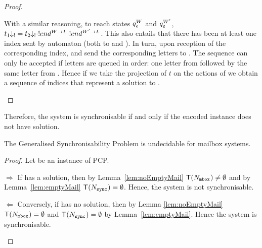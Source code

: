 \begin{proof}
\begin{compactdesc}
 With a similar reasoning, to reach states ${q}_{e}^{W}$ and ${q}_{e}^{W'}$,  $t_1{\downarrow_{!}} = t_2{\downarrow_{!}}  \cdot !end^{W \rightarrow L} \cdot !end^{W' \rightarrow L}$.
 This also entails that there has been at least one index sent by automaton  (both to  and ).
 In turn, upon reception of the corresponding index,   and  send the corresponding letters to . 
 The sequence can only be accepted if letters are queued in order: one letter from   followed by the same letter from .
Hence if we take the projection of $t$ on the actions of  we obtain a sequence of indices that represent a solution to \pcpinstance{}. 
\qedhere
 \end{compactdesc}
\end{proof}

%
Therefore, the system is synchronisable if and only if the encoded instance does not have solution.  
%
%
%
\begin{theorem}\label{theorem:mail}
The Generalised Synchronisability Problem is undecidable for mailbox systems. 
\end{theorem}
\begin{proof}
Let \pcpinstance{} be an instance of PCP. 
\begin{compactdesc}
\item[$\Rightarrow$] 
If \pcpinstance{} has a solution, then  by Lemma~\ref{lem:noEmptyMail} 
$\mathsf{T}(N_{{\mathtt{mbox}}^{}}) \neq \emptyset$ and 
by Lemma~\ref{lem:emptyMail} 
$\mathsf{T}(N_{{\mathtt{sync}}^{}}) = \emptyset$.
Hence, the system is not synchronisable.
\item[$\Leftarrow$] 
Conversely, if \pcpinstance{} has no solution, then by Lemma \ref{lem:noEmptyMail} $\mathsf{T}(N_{{\mathtt{mbox}}^{}}) = \emptyset$ and $\mathsf{T}(N_{{\mathtt{sync}}^{}}) = \emptyset$ by Lemma~\ref{lem:emptyMail}. Hence the system is synchronisable.
\qedhere
\end{compactdesc} 
\end{proof}



